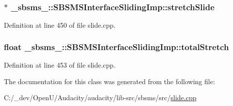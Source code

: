 \subsubsection[{\texorpdfstring{stretch\+Slide}{stretchSlide}}]{$\ast$ \+\_\+sbsms\+\_\+\+::\+S\+B\+S\+M\+S\+Interface\+Sliding\+Imp\+::stretch\+Slide\hspace{0.3cm}{\ttfamily [protected]}}\hypertarget{class__sbsms___1_1_s_b_s_m_s_interface_sliding_imp_a56b988206b213ca52f53db3e203785eb}{}\label{class__sbsms___1_1_s_b_s_m_s_interface_sliding_imp_a56b988206b213ca52f53db3e203785eb}


Definition at line 450 of file slide.\+cpp.

\subsubsection[{\texorpdfstring{total\+Stretch}{totalStretch}}]{\setlength{\rightskip}{0pt plus 5cm}float \+\_\+sbsms\+\_\+\+::\+S\+B\+S\+M\+S\+Interface\+Sliding\+Imp\+::total\+Stretch\hspace{0.3cm}{\ttfamily [protected]}}\hypertarget{class__sbsms___1_1_s_b_s_m_s_interface_sliding_imp_a63e50de699224b59147938a5cc17b24a}{}\label{class__sbsms___1_1_s_b_s_m_s_interface_sliding_imp_a63e50de699224b59147938a5cc17b24a}


Definition at line 453 of file slide.\+cpp.



The documentation for this class was generated from the following file\+:\begin{DoxyCompactItemize}
\item 
C\+:/\+\_\+dev/\+Open\+U/\+Audacity/audacity/lib-\/src/sbsms/src/\hyperlink{slide_8cpp}{slide.\+cpp}\end{DoxyCompactItemize}
